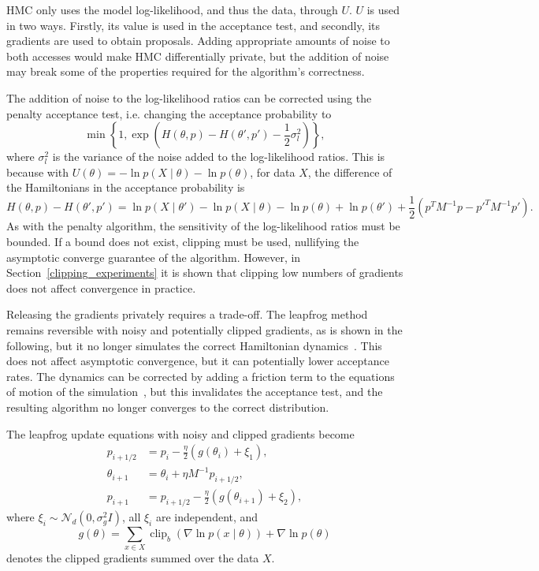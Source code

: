 \documentclass[english,twoside,openright]{HYgraduMLDS}
\newcommand{\caln}{{\mathcal{N}}}
\DeclareMathOperator{\clip}{clip}
\begin{document}
HMC only uses the model log-likelihood, and thus the data, through \(U\).
\(U\) is used in two ways. Firstly, its value is used in the acceptance test,
and secondly, its gradients are used to obtain proposals. Adding appropriate
amounts of noise to both accesses would make HMC differentially private, but the addition of
noise may break some of the properties required for the algorithm's correctness.

The addition of noise to the log-likelihood ratios can be corrected using the penalty
acceptance test, i.e. changing the acceptance probability to
\[
    \min\left\{1, \exp\left(H(\theta, p) - H(\theta', p') - \frac{1}{2}\sigma_{l}^{2}\right)\right\},
\]
where \(\sigma_{l}^{2}\) is the variance of the noise added to the log-likelihood
ratios. This is because with
\(U(\theta) = -\ln p(X\mid \theta) - \ln p(\theta)\),  for data \(X\),
the difference of the Hamiltonians in the acceptance probability is
\[
  H(\theta, p) - H(\theta', p') = \ln p(X\mid \theta') - \ln p(X\mid \theta)
  - \ln p(\theta) + \ln p(\theta')
  + \frac{1}{2}(p^{T}M^{-1}p - p'^{T}M^{-1}p').
\]
As with the penalty algorithm, the sensitivity of the log-likelihood ratios must
be bounded. If a bound does not exist, clipping must be used, nullifying the asymptotic
converge guarantee of the algorithm. However, in Section~\ref{clipping_experiments}
it is shown that
clipping low numbers of gradients does not affect convergence in practice.

Releasing the gradients privately requires a trade-off. The leapfrog method remains
reversible with noisy and potentially clipped gradients, as is shown in the following,
but it no longer simulates the correct Hamiltonian dynamics~\cite{CFG14}. This does not affect
asymptotic convergence, but it can potentially lower acceptance rates.
The dynamics can be corrected by adding a friction term to the equations of
motion of the simulation~\cite{CFG14}, but this invalidates the acceptance test,
and the resulting algorithm no longer converges to the correct distribution.

The leapfrog update equations with noisy and clipped gradients become
\begin{align*}
  p_{i+1/2} &= p_{i} - \frac{\eta}{2}(g(\theta_{i}) + \xi_{1}), \\
  \theta_{i+1} &= \theta_{i} + \eta M^{-1}p_{i+1/2}, \\
  p_{i+1} &= p_{i+1/2} - \frac{\eta}{2}(g(\theta_{i+1}) + \xi_{2}),
\end{align*}
where
\(\xi_{i} \sim \caln_{d}(0, \sigma_{g}^{2}I)\), all \(\xi_{i}\) are independent, and
\[
  g(\theta) = \sum_{x\in X}\clip_{b}(\nabla \ln p(x\mid \theta)) + \nabla\ln p(\theta)
\]
denotes the clipped gradients summed over the data \(X\).
\end{document}
